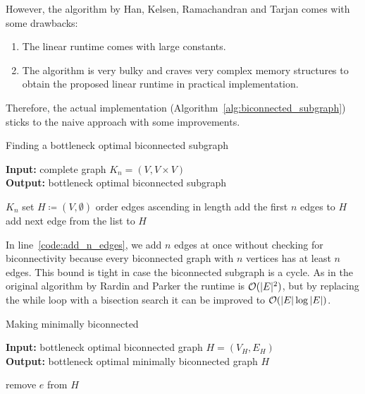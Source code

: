 However, the algorithm by Han, Kelsen, Ramachandran and Tarjan comes with some drawbacks:
\begin{enumerate}
  \item The linear runtime comes with large constants.
  \item The algorithm is very bulky and craves very complex memory structures to obtain the proposed linear runtime in practical implementation.
\end{enumerate}

Therefore, the actual implementation (Algorithm~\ref{alg:biconnected_subgraph}) sticks to the naive approach with some improvements.

\begin{algorithm}[ht!]
  \caption{Finding a bottleneck optimal biconnected subgraph}\label{alg:biconnected_subgraph}
  \textbf{Input:} complete graph \(K_n = (V, V \times V)\)\\
  \textbf{Output:} bottleneck optimal biconnected subgraph
  \begin{algorithmic}[1]
     {$K_n$}
      \State set \(H \coloneqq (V, \emptyset)\)
      \State order edges ascending in length
      \State add the first \(n\) edges to \(H\)\label{code:add_n_edges}
        \State add next edge from the list to \(H\)
      \EndWhile
      \State{}
    \EndProcedure
  \end{algorithmic}
\end{algorithm}

In line~\ref{code:add_n_edges}, we add \(n\) edges at once without checking for biconnectivity because every biconnected graph with \(n\) vertices has at least \(n\) edges. This bound is tight in case the biconnected subgraph is a cycle. As in the original algorithm by Rardin and Parker the runtime is \(\mathcal{O}(\vert E \vert^2)\), but by replacing the while loop with a bisection search it can be improved to \(\mathcal{O}(\vert E \vert\log \vert E \vert)\).

\begin{algorithm}[ht!]
  \caption{Making minimally biconnected}\label{alg:minimally_biconnected}
  \textbf{Input: } bottleneck optimal biconnected graph \(H = (V_H, E_H)\)\\
  \textbf{Output: } bottleneck optimal minimally biconnected graph \(H\)
  \begin{algorithmic}[1]
          \State remove \(e\) from \(H\)
        \EndIf
      \EndFor
      \State {}
    \EndProcedure
  \end{algorithmic}
\end{algorithm}

